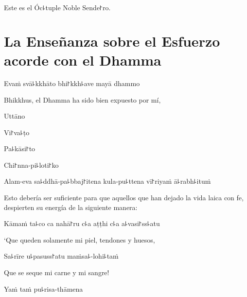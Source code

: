 \begin{english}
	Este es el Óc꜕tuple Noble Sende꜓ro.
\end{english}

\chapter[Esfuerzo acorde con el Dhamma]{La Enseñanza sobre el Esfuerzo acorde con el Dhamma}



\begin{leader}
\end{leader}

Evaṁ svā꜕kkhāto bhi꜓kkh꜕ave mayā dhammo

\begin{english}
	Bhikkhus, el Dhamma ha sido bien expuesto por mí,
\end{english}

Uttāno


Vi꜓va꜕ṭo


Pa꜕kāsi꜓to


Chi꜓nna-pi꜕loti꜓ko


Alam-eva sa꜕ddhā-pa꜕bbaj꜓itena kula-pu꜕ttena vī꜓riyaṁ ā꜕rabh꜕ituṁ

\begin{english}
	Esto debería ser suficiente para que aquellos que han dejado la vida laica con fe, despierten su energía de la siguiente manera:
\end{english}

Kāmaṁ ta꜕co ca nahā꜓ru c꜕a aṭṭhi c꜕a a꜕vasi꜓ss꜕atu

\begin{english}
	`Que queden solamente mi piel, tendones y huesos,
\end{english}

Sa꜕rīre u꜕pasuss꜓atu maṁsa꜕-lohi꜕taṁ

\begin{english}
	Que se seque mi carne y mi sangre!
\end{english}

Yaṁ taṁ pu꜕risa-thāmena

